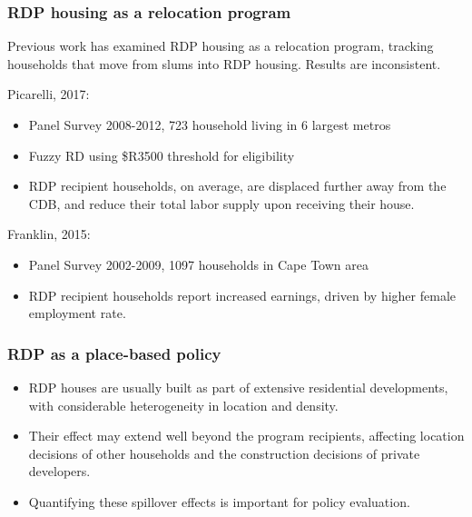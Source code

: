 \documentclass[aspectratio=149]{beamer}
\begin{document}

\begin{frame}
\frametitle{RDP housing as a relocation program }
Previous work has examined RDP housing as a relocation program, tracking households that move from slums into RDP housing. Results are inconsistent.

\vspace{.5em}

Picarelli, 2017:
  \begin{itemize}
    \item Panel Survey 2008-2012, 723 household living in 6 largest metros
    \item Fuzzy RD using \$R3500 threshold for eligibility   
    \item RDP recipient households, on average, are displaced further away from the CDB, and reduce their total labor supply upon receiving their house.
  \end{itemize}

  \vspace{.5em}

Franklin, 2015:
  \begin{itemize}
    \item Panel Survey 2002-2009, 1097 households in Cape Town area 
    \item RDP recipient households report increased earnings, driven by higher female employment rate.
  \end{itemize}




\end{frame}




\begin{frame}
\frametitle{RDP as a place-based policy}
  \begin{itemize}
    \item RDP houses are usually built as part of extensive residential developments, with considerable heterogeneity in location and density.
    \vspace{2mm}
    \item Their effect may extend well beyond the program recipients, affecting location decisions of other households and the construction decisions of private developers. 
    \vspace{2mm}
    \item Quantifying these spillover effects is important for policy evaluation.
  \end{itemize}

\end{frame}
\end{document}
